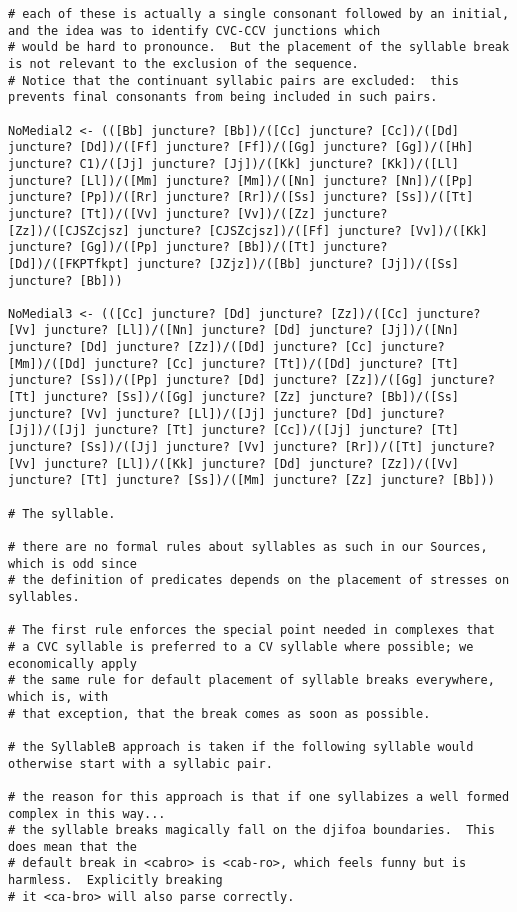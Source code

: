\documentclass[12pt]{book}
\begin{document}
{\begin{verbatim}
# each of these is actually a single consonant followed by an initial, and the idea was to identify CVC-CCV junctions which
# would be hard to pronounce.  But the placement of the syllable break is not relevant to the exclusion of the sequence.
# Notice that the continuant syllabic pairs are excluded:  this prevents final consonants from being included in such pairs.

NoMedial2 <- (([Bb] juncture? [Bb])/([Cc] juncture? [Cc])/([Dd] juncture? [Dd])/([Ff] juncture? [Ff])/([Gg] juncture? [Gg])/([Hh] juncture? C1)/([Jj] juncture? [Jj])/([Kk] juncture? [Kk])/([Ll] juncture? [Ll])/([Mm] juncture? [Mm])/([Nn] juncture? [Nn])/([Pp] juncture? [Pp])/([Rr] juncture? [Rr])/([Ss] juncture? [Ss])/([Tt] juncture? [Tt])/([Vv] juncture? [Vv])/([Zz] juncture? [Zz])/([CJSZcjsz] juncture? [CJSZcjsz])/([Ff] juncture? [Vv])/([Kk] juncture? [Gg])/([Pp] juncture? [Bb])/([Tt] juncture? [Dd])/([FKPTfkpt] juncture? [JZjz])/([Bb] juncture? [Jj])/([Ss] juncture? [Bb]))

NoMedial3 <- (([Cc] juncture? [Dd] juncture? [Zz])/([Cc] juncture? [Vv] juncture? [Ll])/([Nn] juncture? [Dd] juncture? [Jj])/([Nn] juncture? [Dd] juncture? [Zz])/([Dd] juncture? [Cc] juncture? [Mm])/([Dd] juncture? [Cc] juncture? [Tt])/([Dd] juncture? [Tt] juncture? [Ss])/([Pp] juncture? [Dd] juncture? [Zz])/([Gg] juncture? [Tt] juncture? [Ss])/([Gg] juncture? [Zz] juncture? [Bb])/([Ss] juncture? [Vv] juncture? [Ll])/([Jj] juncture? [Dd] juncture? [Jj])/([Jj] juncture? [Tt] juncture? [Cc])/([Jj] juncture? [Tt] juncture? [Ss])/([Jj] juncture? [Vv] juncture? [Rr])/([Tt] juncture? [Vv] juncture? [Ll])/([Kk] juncture? [Dd] juncture? [Zz])/([Vv] juncture? [Tt] juncture? [Ss])/([Mm] juncture? [Zz] juncture? [Bb]))

# The syllable.  

# there are no formal rules about syllables as such in our Sources, which is odd since
# the definition of predicates depends on the placement of stresses on syllables.

# The first rule enforces the special point needed in complexes that
# a CVC syllable is preferred to a CV syllable where possible; we economically apply
# the same rule for default placement of syllable breaks everywhere, which is, with
# that exception, that the break comes as soon as possible.

# the SyllableB approach is taken if the following syllable would otherwise start with a syllabic pair.

# the reason for this approach is that if one syllabizes a well formed complex in this way...
# the syllable breaks magically fall on the djifoa boundaries.  This does mean that the
# default break in <cabro> is <cab-ro>, which feels funny but is harmless.  Explicitly breaking
# it <ca-bro> will also parse correctly.


\end{verbatim}}
\end{document}
